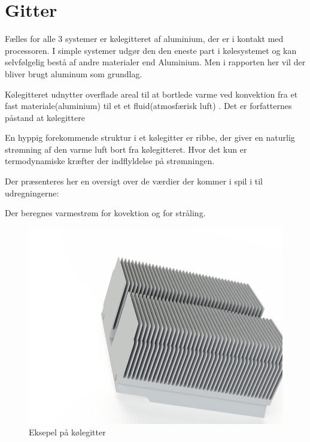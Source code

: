 \section{Gitter}

Fælles for alle 3 systemer er kølegitteret af aluminium, der er i kontakt med processoren. 
I simple systemer udgør den den eneste part i kølesystemet og kan selvfølgelig bestå af andre materialer end Aluminium. 
Men i rapporten her vil der bliver brugt aluminum som grundlag. 

Kølegitteret udnytter overflade areal til at bortlede varme ved konvektion fra et fast materiale(aluminium) til et et fluid(atmosfærisk luft) .
Det er forfatternes påstand at kølegittere

En hyppig forekommende struktur i et kølegitter er ribbe, der giver en naturlig strømning af den varme luft bort fra kølegitteret. Hvor det kun er termodynamiske kræfter der indflyldelse på strømningen.

Der præsenteres her en oversigt over de værdier der kommer i spil i til udregningerne: 

Der beregnes varmestrøm for kovektion og for stråling.

\begin{figure}
	\centering
	\includegraphics[width=0.7\linewidth]{billeder/heatsink1}
	\caption{Eksepel på kølegitter}
	\label{fig:heatsink1}
\end{figure}


